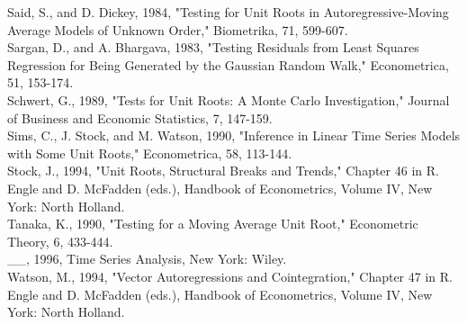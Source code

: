 \documentclass[10pt]{article}
\begin{document}
Said, S., and D. Dickey, 1984, "Testing for Unit Roots in Autoregressive-Moving Average Models of Unknown Order," Biometrika, 71, 599-607.\\
Sargan, D., and A. Bhargava, 1983, "Testing Residuals from Least Squares Regression for Being Generated by the Gaussian Random Walk," Econometrica, 51, 153-174.\\
Schwert, G., 1989, "Tests for Unit Roots: A Monte Carlo Investigation," Journal of Business and Economic Statistics, 7, 147-159.\\
Sims, C., J. Stock, and M. Watson, 1990, "Inference in Linear Time Series Models with Some Unit Roots," Econometrica, 58, 113-144.\\
Stock, J., 1994, "Unit Roots, Structural Breaks and Trends," Chapter 46 in R. Engle and D. McFadden (eds.), Handbook of Econometrics, Volume IV, New York: North Holland.\\
Tanaka, K., 1990, "Testing for a Moving Average Unit Root," Econometric Theory, 6, 433-444.\\
\_\_, 1996, Time Series Analysis, New York: Wiley.\\
Watson, M., 1994, "Vector Autoregressions and Cointegration," Chapter 47 in R. Engle and D. McFadden (eds.), Handbook of Econometrics, Volume IV, New York: North Holland.
\end{document}
